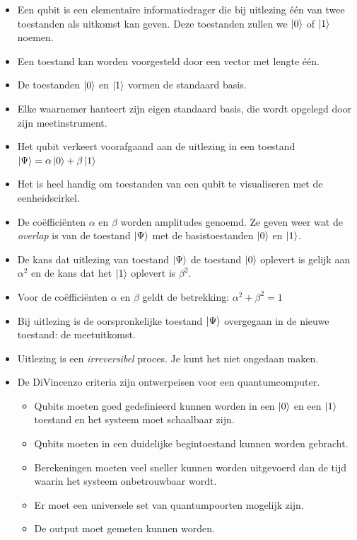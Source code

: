 \documentclass[../../main.tex]{subfiles}
\begin{document}
\begin{itemize}
\item Een qubit is een elementaire informatiedrager die bij uitlezing \'e\'en van twee toestanden als uitkomst kan geven. Deze toestanden zullen we $\ket{0}$ of $\ket{1}$ noemen.  
\item Een toestand kan worden voorgesteld door een vector met lengte \'e\'en.
\item De toestanden $\ket{0}$ en $\ket{1}$ vormen de standaard basis. 
\item Elke waarnemer hanteert zijn eigen standaard basis, die wordt opgelegd door zijn meetinstrument.
\item Het qubit verkeert voorafgaand aan de uitlezing in een toestand 
$\ket{\Psi} = \alpha \ket{0} + \beta \ket{1}$
\item Het is heel handig om toestanden van een qubit te visualiseren met de eenheidscirkel.
\item De co\"effici\"enten $\alpha$ en $\beta$ worden amplitudes genoemd. Ze geven weer wat de \textit{overlap} is van de toestand $\ket{\Psi}$ met de basistoestanden $\ket{0}$ en $\ket{1}$. 
\item De kans dat uitlezing van toestand $\ket{\Psi}$ de toestand $\ket{0}$ oplevert is gelijk aan $\alpha^2$  en de kans dat het $\ket{1}$ oplevert is $\beta^2$.
\item Voor de co\"effici\"enten $\alpha$ en $\beta$ geldt de betrekking: $\alpha^2 + \beta^2=1$
\item Bij uitlezing is de oorspronkelijke toestand $\ket{\Psi}$ overgegaan in de nieuwe toestand: de meetuitkomst.
\item Uitlezing is een \textit{irreversibel} proces. Je kunt het niet ongedaan maken. 
\item De DiVincenzo criteria zijn ontwerpeisen voor een quantumcomputer. 
\begin{itemize} 
\item Qubits moeten goed gedefinieerd kunnen worden in een $\ket{0}$ en een $\ket{1}$ toestand en het systeem moet schaalbaar zijn. 
\item Qubits moeten in een duidelijke begintoestand kunnen worden gebracht. 
\item Berekeningen moeten veel sneller kunnen worden uitgevoerd dan de tijd waarin het systeem onbetrouwbaar wordt. 
\item Er moet een universele set van quantumpoorten mogelijk zijn. 
\item De output moet gemeten kunnen worden. 
\end{itemize}
\end{itemize}
\end{document}
